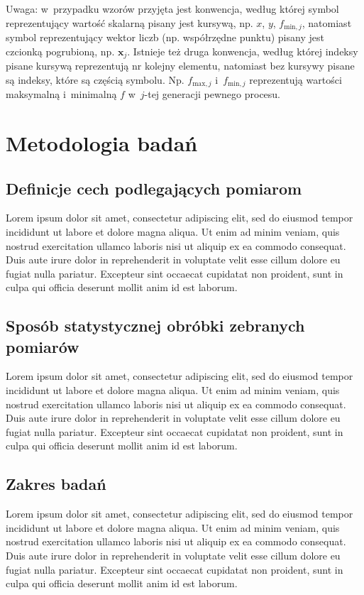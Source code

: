 \documentclass[final,a4paper,openany,12pt]{mwbk}
\begin{document}
Uwaga: w~przypadku wzorów przyjęta jest konwencja, według której symbol reprezentujący wartość skalarną pisany jest kursywą, np. $x$, $y$, $f_{\mathrm{min},j}$, natomiast symbol reprezentujący wektor liczb (np. współrzędne punktu) pisany jest czcionką pogrubioną, np. $\textbf{x}_j$. Istnieje też druga konwencja, według której indeksy pisane kursywą reprezentują nr kolejny elementu, natomiast bez kursywy pisane są indeksy, które są częścią symbolu. Np. $f_{\mathrm{max},j}$ i~$f_{\mathrm{min},j}$ reprezentują wartości maksymalną i~minimalną $f$ w~$j$-tej generacji pewnego procesu.

\chapter{Metodologia badań}

\section{Definicje cech podlegających pomiarom}

Lorem ipsum dolor sit amet, consectetur adipiscing elit, sed do eiusmod tempor incididunt ut labore et dolore magna aliqua. Ut enim ad minim veniam, quis nostrud exercitation ullamco laboris nisi ut aliquip ex ea commodo consequat. Duis aute irure dolor in reprehenderit in voluptate velit esse cillum dolore eu fugiat nulla pariatur. Excepteur sint occaecat cupidatat non proident, sunt in culpa qui officia deserunt mollit anim id est laborum.

\section{Sposób statystycznej obróbki zebranych pomiarów}

Lorem ipsum dolor sit amet, consectetur adipiscing elit, sed do eiusmod tempor incididunt ut labore et dolore magna aliqua. Ut enim ad minim veniam, quis nostrud exercitation ullamco laboris nisi ut aliquip ex ea commodo consequat. Duis aute irure dolor in reprehenderit in voluptate velit esse cillum dolore eu fugiat nulla pariatur. Excepteur sint occaecat cupidatat non proident, sunt in culpa qui officia deserunt mollit anim id est laborum.

\section{Zakres badań}

Lorem ipsum dolor sit amet, consectetur adipiscing elit, sed do eiusmod tempor incididunt ut labore et dolore magna aliqua. Ut enim ad minim veniam, quis nostrud exercitation ullamco laboris nisi ut aliquip ex ea commodo consequat. Duis aute irure dolor in reprehenderit in voluptate velit esse cillum dolore eu fugiat nulla pariatur. Excepteur sint occaecat cupidatat non proident, sunt in culpa qui officia deserunt mollit anim id est laborum.
\end{document}
